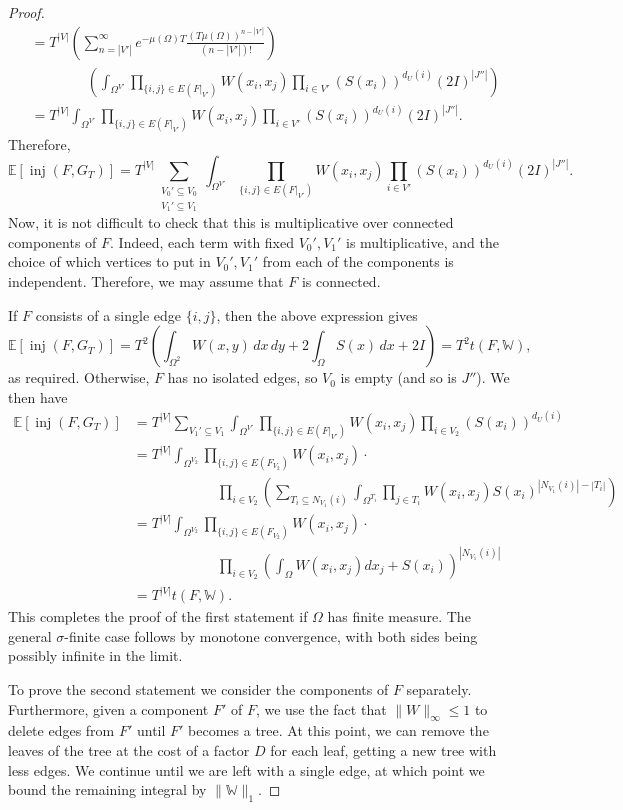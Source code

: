 \documentclass{amsart}
\numberwithin{equation}{section}
\numberwithin{figure}{section}
\theoremstyle{definition}
\theoremstyle{remark}
\DeclareMathOperator{\inj}{inj}
\newcommand{\EE}{\mathbb{E}}
\newcommand{\cW}{\mathbb{W}}
\begin{document}
\begin{proof}
\begin{align*}
&=
T^{|V|} \left(\sum_{n=|V'|}^\infty e^{-\mu(\Omega)T} \frac{(T\mu(\Omega))^{n-|V'|}}{(n-|V'|)!} \right)\\
& \qquad \qquad \left(\int_{\Omega^{V'}}\prod_{\{i,j\} \in E(F|_{V'})} W(x_i,x_j) \prod_{i \in V'} (S(x_i))^{d_U(i)} (2I)^{|J''|}\right)\\
&=
T^{|V|}\int_{\Omega^{V'}}\prod_{\{i,j\} \in E(F|_{V'})} W(x_i,x_j) \prod_{i \in V'} (S(x_i))^{d_U(i)} (2I)^{|J''|}
.
\end{align*}
Therefore,
\[
\EE[\inj(F,G_T)]=T^{|V|} \sum_{\substack{V_0' \subseteq V_0\\V_1' \subseteq
V_1}}\int_{\Omega^{V'}}\prod_{\{i,j\} \in E(F|_{V'})} W(x_i,x_j) \prod_{i \in
V'} (S(x_i))^{d_U(i)} (2I)^{|J''|} .\] Now, it is not difficult to check that
this is multiplicative over connected components of $F$. Indeed, each term
with fixed $V_0',V_1'$ is multiplicative, and the choice of which vertices to
put in $V_0',V_1'$ from each of the components is independent. Therefore, we
may assume that $F$ is connected.

If $F$ consists of a single edge $\{i,j\}$, then the above expression gives
\[\EE[\inj(F,G_T)]=T^2\left(\int_{\Omega^2}W(x,y)\,dx\,dy + 2 \int_\Omega S(x) \,dx +
2I\right)=T^2t(F,\cW),
\]
as required. Otherwise, $F$ has no isolated edges, so $V_0$ is empty (and so
is $J''$). We then have
\begin{align*}
\EE[\inj(F,G_T)]&=T^{|V|}\sum_{V_1' \subseteq V_1} \int_{\Omega^{V'}} \prod_{\{i,j\} \in E(F|_{V'})}W(x_i,x_j) \prod_{i \in V_2} (S(x_i))^{d_U(i)}\\
&=T^{|V|}\int_{\Omega^{V_2}} \prod_{\{i,j\} \in E(F_{V_2})} W(x_i,x_j) \cdot \phantom{}\\
& \qquad \qquad\qquad \prod_{i \in V_2} \left( \sum_{T_i \subseteq N_{V_1}(i)} \int_{\Omega^{T_i}}\prod_{j \in T_i} W(x_i,x_j) S(x_i)^{|N_{V_1}(i)|-|T_i|} \right)\\
&= T^{|V|}\int_{\Omega^{V_2}} \prod_{\{i,j\} \in E(F_{V_2})} W(x_i,x_j) \cdot \phantom{}\\
& \qquad \qquad \qquad \prod_{i \in V_2} \left( \int_\Omega W(x_i,x_j) dx_j + S(x_i) \right)^{|N_{V_1}(i)|}\\
&=T^{|V|}t(F,\cW).
\end{align*}
This completes the proof of the first statement if $\Omega$ has finite
measure. The general $\sigma$-finite case follows by monotone convergence,
with both sides being possibly infinite in the limit.

To prove the second statement we consider the components of $F$ separately.
Furthermore, given a component $F'$ of $F$, we use the fact that
$\|W\|_\infty\leq 1$ to delete edges from $F'$ until $F'$ becomes a tree. At
this point, we can remove the leaves of the tree at the cost of a factor $D$
for each leaf, getting a new tree with less edges. We continue until we are
left with a single edge, at which point we bound the remaining integral by
$\|\cW\|_1$.
\end{proof}
\end{document}
